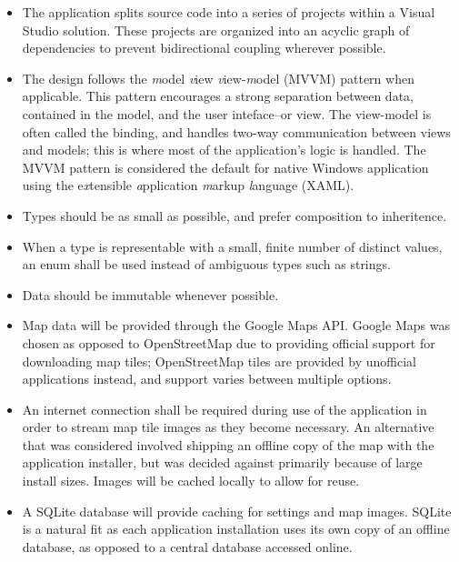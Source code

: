 \documentclass[12pt, letterpaper]{article}
\begin{document}
\begin{itemize}
  \item The application splits source code into a series of projects within a Visual Studio solution.
    These projects are organized into an acyclic graph of dependencies to prevent bidirectional coupling wherever possible.
  \item The design follows the \emph{m}odel \emph{v}iew \emph{v}iew-\emph{m}odel (MVVM) pattern when applicable.
    This pattern encourages a strong separation between data, contained in the model, and the user inteface--or view.
    The view-model is often called the binding, and handles two-way communication between views and models;
    this is where most of the application's logic is handled.
    The MVVM pattern is considered the default for native Windows application using the e\emph{x}tensible \emph{a}pplication \emph{m}arkup \emph{l}anguage (XAML)\cite{msdn_mvvm}.
  \item Types should be as small as possible, and prefer composition to inheritence.
  \item When a type is representable with a small, finite number of distinct values, an enum shall be used instead of ambiguous types such as strings.
  \item Data should be immutable whenever possible.
  \item Map data will be provided through the Google Maps API.
    Google Maps was chosen as opposed to OpenStreetMap due to providing official support for downloading map tiles\cite{gmaps_tiles};
    OpenStreetMap tiles are provided by unofficial applications instead, and support varies between multiple options\cite{osm_tiles}.
  \item An internet connection shall be required during use of the application in order to stream map tile images as they become necessary.
    An alternative that was considered involved shipping an offline copy of the map with the application installer,
    but was decided against primarily because of large install sizes.
    Images will be cached locally to allow for reuse.
  \item A SQLite database will provide caching for settings and map images.
    SQLite is a natural fit as each application installation uses its own copy of an offline database, as opposed to a central database accessed online.
\end{itemize}
\end{document}
